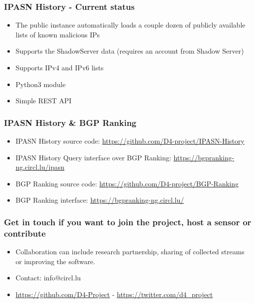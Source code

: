 \documentclass{beamer}
\begin{document}
\begin{frame}
    \frametitle{IPASN History - Current status}
    \begin{itemize}
        \item The public instance automatically loads a couple dozen of publicly available lists of known malicious IPs
        \item Supports the ShadowServer data (requires an account from Shadow Server)
        \item Supports IPv4 and IPv6 lists
        \item Python3 module
        \item Simple REST API
    \end{itemize}
\end{frame}

\begin{frame}
    \frametitle{IPASN History \& BGP Ranking}
    \begin{itemize}
        \item IPASN History source code: \url{https://github.com/D4-project/IPASN-History}
        \item IPASN History Query interface over BGP Ranking: \url{https://bgpranking-ng.circl.lu/ipasn}
        \item BGP Ranking source code: \url{https://github.com/D4-project/BGP-Ranking}
        \item BGP Ranking interface: \url{https://bgpranking-ng.circl.lu/}
    \end{itemize}
\end{frame}

\begin{frame}
\frametitle{Get in touch if you want to join the project, host a sensor or contribute}
\begin{itemize}
\item Collaboration can include research partnership, sharing of collected streams or improving the software.
\item Contact: info@circl.lu
\item \url{https://github.com/D4-Project} -  \url{https://twitter.com/d4_project}
\end{itemize}
\end{frame}
\end{document}
